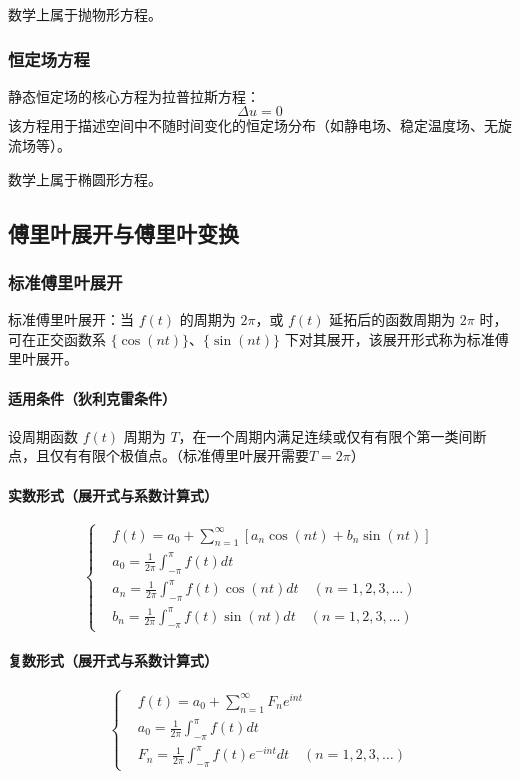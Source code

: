 \documentclass{article}
\begin{document}
	数学上属于抛物形方程。
	
	\subsubsection{恒定场方程}
	静态恒定场的核心方程为拉普拉斯方程：
	\[
	\Delta u = 0
	\]
	该方程用于描述空间中不随时间变化的恒定场分布（如静电场、稳定温度场、无旋流场等）。
	
	数学上属于椭圆形方程。
	
	\subsection{傅里叶展开与傅里叶变换}
	
	\subsubsection{标准傅里叶展开}
	标准傅里叶展开：当 \( f(t) \) 的周期为 \( 2\pi \)，或 \( f(t) \) 延拓后的函数周期为 \( 2\pi \) 时，可在正交函数系 \( \{\cos(nt)\}、\{\sin(nt)\} \) 下对其展开，该展开形式称为标准傅里叶展开。
	
	\paragraph{适用条件（狄利克雷条件）}
	设周期函数 \( f(t) \) 周期为 \( T \)，在一个周期内满足连续或仅有有限个第一类间断点，且仅有有限个极值点。（标准傅里叶展开需要$T = 2\pi $）
	
	\paragraph{实数形式（展开式与系数计算式）}
	\[
	\left\{
	\begin{aligned}
		&f(t) = a_0 + \sum_{n = 1}^{\infty} \left[ a_n \cos(nt) + b_n \sin(nt) \right] \\
		&a_0 = \frac{1}{2\pi} \int_{-\pi}^{\pi} f(t) dt \\
		&a_n = \frac{1}{2\pi} \int_{-\pi}^{\pi} f(t) \cos(nt) dt \quad (n = 1,2,3,\dots) \\
		&b_n = \frac{1}{2\pi} \int_{-\pi}^{\pi} f(t) \sin(nt) dt \quad (n = 1,2,3,\dots)
	\end{aligned}
	\right.
	\]
	
	\paragraph{复数形式（展开式与系数计算式）}
	\[
	\left\{
	\begin{aligned}
		&f(t) = a_0 + \sum_{n = 1}^{\infty} F_n e^{int} \\
		&a_0 = \frac{1}{2\pi} \int_{-\pi}^{\pi} f(t) dt \\
		&F_n = \frac{1}{2\pi} \int_{-\pi}^{\pi} f(t) e^{-int} dt \quad (n = 1,2,3,\dots)
	\end{aligned}
	\right.
	\]
	
\end{document}
